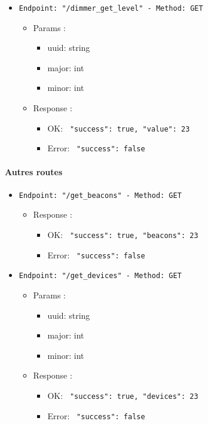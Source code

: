 \begin{itemize}
  \item \texttt{Endpoint: "/dimmer_get_level" -  Method: GET}
  \begin{itemize} 
    \item Params :
    \begin{itemize}
      \item uuid: string
      \item major: int
      \item minor: int
    \end{itemize}

    \item Response : 
    \begin{itemize}
      \item OK: \texttt{{ "success": true, "value": 23 }}
      \item Error: \texttt{{ "success": false }}
    \end{itemize}
  \end{itemize}
\end{itemize}

\paragraph{Autres routes}

\begin{itemize}
  \item \texttt{Endpoint: "/get_beacons" -  Method: GET}
  \begin{itemize}
    \item Response : 
    \begin{itemize}
      \item OK: \texttt{{ "success": true, "beacons": 23 }}
      \item Error: \texttt{{ "success": false }}
    \end{itemize}
  \end{itemize}
\end{itemize}

\begin{itemize}
  \item \texttt{Endpoint: "/get_devices" -  Method: GET}
  \begin{itemize} 
    \item Params :
    \begin{itemize}
      \item uuid: string
      \item major: int
      \item minor: int
    \end{itemize}

    \item Response : 
    \begin{itemize}
      \item OK: \texttt{{ "success": true, "devices": 23 }}
      \item Error: \texttt{{ "success": false }}
    \end{itemize}
  \end{itemize}
\end{itemize}

